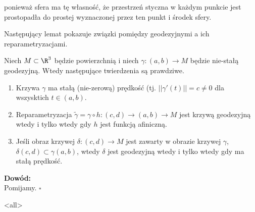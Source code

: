 ponieważ sfera ma tę własność, że przestrzeń styczna w każdym punkcie jest prostopadła do prostej wyznaczonej przez ten punkt i środek sfery.

Następujący lemat pokazuje związki pomiędzy geodezyjnymi a ich reparametryzacjami.
\begin{frame}
\begin{lemat}\label{lem:param-of-geodesics}
Niech $M\subset \R^3$ będzie powierzchnią i niech $\gamma\colon(a,b)\to M$ będzie nie-stałą geodezyjną. Wtedy następujące twierdzenia są prawdziwe.
\begin{enumerate}
\item Krzywa $\gamma$ ma stałą (nie-zerową) prędkość (tj. $||\gamma'(t)||=c\neq 0$ dla wszysktich $t\in(a,b)$.
\pause\item Reparametryzacja $\widetilde{\gamma}=\gamma\circ h\colon (c,d)\to (a,b)\to M$ jest krzywą geodezyjną wtedy i tylko wtedy gdy $h$ jest funkcją afiniczną.
\pause\item Jeśli obraz krzywej $\delta\colon (c,d)\to M$ jest zawarty w obrazie krzywej $\gamma$, $\delta(c,d)\subset \gamma(a,b)$, wtedy $\delta$ jest geodezyjną wtedy i tylko wtedy gdy ma stałą prędkość.
\end{enumerate}
\end{lemat}

\pause \textcolor{ared}{\textbf{Dowód:}}\\
Pomijamy.
\hfill $\square$

\end{frame}

\mode<all> 
